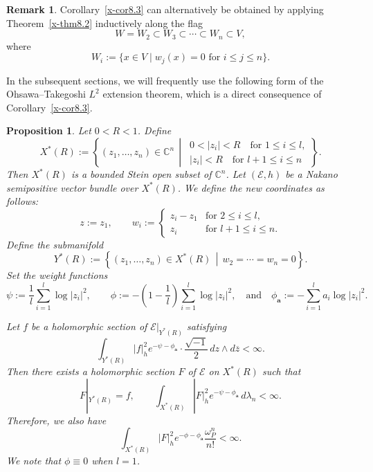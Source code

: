 \documentclass[12pt,twoside]{amsart}
\newtheorem{prop}[thm]{Proposition}
\theoremstyle{definition}
\newtheorem{rem}[thm]{Remark}
\begin{document}
\begin{rem}\label{x-rem8.4}
Corollary~\ref{x-cor8.3} can alternatively be obtained by applying
Theorem~\ref{x-thm8.2} inductively along the flag
\[
W = W_2 \subset W_3 \subset \cdots \subset W_n \subset V,
\]
where
\[
W_i := \{ x \in V \mid w_j(x) = 0 \text{ for } i \le j \le n \}.
\]
\end{rem}

In the subsequent sections, we will frequently use the following
form of the Ohsawa--Takegoshi $L^2$ extension theorem, which is a direct
consequence of Corollary~\ref{x-cor8.3}.

\begin{prop}\label{x-prop8.5}
Let $0 < R < 1$. Define
\[
X^*(R) := \left\{ (z_1, \ldots, z_n) \in \mathbb{C}^n \,\middle|\, 
\begin{array}{l}
0 < |z_i| < R \quad \text{for } 1 \leq i \leq l, \\
|z_i| < R \quad \text{for } l+1 \leq i \leq n 
\end{array}
\right\}.
\]
Then $X^*(R)$ is a bounded Stein open subset of $\mathbb{C}^n$. 
Let $(\mathcal{E}, h)$ be a Nakano semipositive vector bundle over $X^*(R)$. 
We define the new coordinates as follows:
\[
z := z_1, \qquad 
w_i := \begin{cases}
z_i - z_1 & \text{for } 2 \leq i \leq l, \\
z_i       & \text{for } l+1 \leq i \leq n.
\end{cases}
\] 
Define the submanifold
\[
Y^*(R) := \left\{ (z_1, \ldots, z_n) 
\in X^*(R) \,\middle|\, w_2 = \cdots = w_n = 0 \right\}.
\] 
Set the weight functions
\[
\psi := \frac{1}{l} \sum_{i=1}^l \log |z_i|^2, \qquad
\phi := -\left(1 - \frac{1}{l}\right) \sum_{i=1}^l \log |z_i|^2, 
\quad \text{and}\quad 
\phi_{\bm a} := -\sum_{i=1}^l a_i\log |z_i|^2.
\]

Let $f$ be a holomorphic section of $\mathcal{E}|_{Y^*(R)}$ satisfying
\[
\int_{Y^*(R)} |f|^2_h e^{-\psi-\phi_{\bm a}}
 \cdot \frac{\sqrt{-1}}{2} \, dz \wedge d\overline{z} < \infty.
\]
Then there exists a holomorphic section $F$ of $\mathcal{E}$ on $X^*(R)$ such that
\begin{equation}\label{x-eq8.1}
F|_{Y^*(R)} = f, \qquad 
\int_{X^*(R)} |F|^2_h e^{-\psi-\phi_{\bm a}} \, d\lambda_n < \infty.
\end{equation}
Therefore, we also have
\begin{equation}\label{x-eq8.2}
\int_{X^*(R)} |F|^2_h e^{-\phi-\phi_{\bm a}} \frac{\omega^n_P}{n!} < \infty.
\end{equation}
We note that $\phi\equiv 0$ when $l=1$. 
\end{prop}
\end{document}
